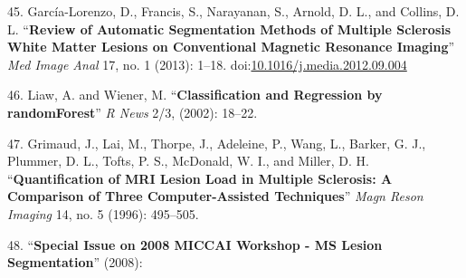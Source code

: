 \documentclass[11pt,]{article}
\begin{document}
\hypertarget{ref-Garcia-Lorenzo:2013aa}{}
45. García-Lorenzo, D., Francis, S., Narayanan, S., Arnold, D. L., and
Collins, D. L. ``\textbf{Review of Automatic Segmentation Methods of
Multiple Sclerosis White Matter Lesions on Conventional Magnetic
Resonance Imaging}'' \emph{Med Image Anal} 17, no. 1 (2013): 1--18.
doi:\href{https://doi.org/10.1016/j.media.2012.09.004}{10.1016/j.media.2012.09.004}

\hypertarget{ref-liaw2002}{}
46. Liaw, A. and Wiener, M. ``\textbf{Classification and Regression by
randomForest}'' \emph{R News} 2/3, (2002): 18--22.

\hypertarget{ref-Grimaud:1996aa}{}
47. Grimaud, J., Lai, M., Thorpe, J., Adeleine, P., Wang, L., Barker, G.
J., Plummer, D. L., Tofts, P. S., McDonald, W. I., and Miller, D. H.
``\textbf{Quantification of MRI Lesion Load in Multiple Sclerosis: A
Comparison of Three Computer-Assisted Techniques}'' \emph{Magn Reson
Imaging} 14, no. 5 (1996): 495--505.

\hypertarget{ref-styner2008}{}
48. ``\textbf{Special Issue on 2008 MICCAI Workshop - MS Lesion
Segmentation}'' (2008):
\end{document}

